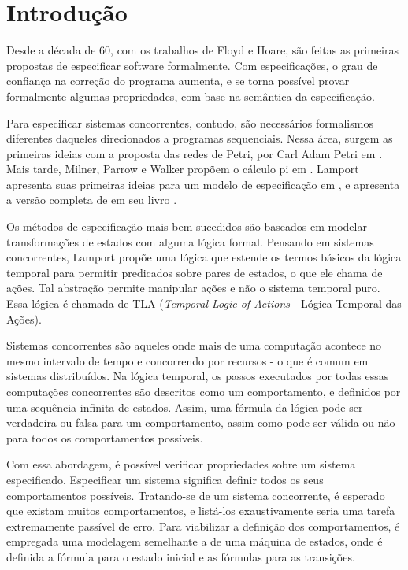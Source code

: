 \chapter{Introdução}
\label{introducao}

Desde a década de 60, com os trabalhos de Floyd e Hoare, são feitas as primeiras propostas de especificar software formalmente. Com especificações, o grau de confiança na correção do programa aumenta, e se torna possível provar formalmente algumas propriedades, com base na semântica da especificação.

Para especificar sistemas concorrentes, contudo, são necessários formalismos diferentes daqueles direcionados a programas sequenciais. Nessa área, surgem as primeiras ideias com a proposta das redes de Petri, por Carl Adam Petri em \cite{petri}. Mais tarde, Milner, Parrow e Walker propõem o cálculo pi em \cite{picalculus}. Lamport apresenta suas primeiras ideias para um modelo de especificação em \cite{first-lamport}, e apresenta a versão completa de \TLA em seu livro \cite{specifying-systems}.

Os métodos de especificação mais bem sucedidos são baseados em modelar transformações de estados com alguma lógica formal. Pensando em sistemas concorrentes, Lamport propõe uma lógica que estende os termos básicos da lógica temporal para permitir predicados sobre pares de estados, o que ele chama de ações. Tal abstração permite manipular ações e não o sistema temporal puro. Essa lógica é chamada de TLA (\textit{Temporal Logic of Actions} - Lógica Temporal das Ações).

Sistemas concorrentes são aqueles onde mais de uma computação acontece no mesmo intervalo de tempo e concorrendo por recursos - o que é comum em sistemas distribuídos. Na lógica temporal, os passos executados por todas essas computações concorrentes são descritos como um comportamento, e definidos por uma sequência infinita de estados. Assim, uma fórmula da lógica pode ser verdadeira ou falsa para um comportamento, assim como pode ser válida ou não para todos os comportamentos possíveis.

Com essa abordagem, é possível verificar propriedades sobre um sistema especificado. Especificar um sistema significa definir todos os seus comportamentos possíveis. Tratando-se de um sistema concorrente, é esperado que existam muitos comportamentos, e listá-los exaustivamente seria uma tarefa extremamente passível de erro. Para viabilizar a definição dos comportamentos, é empregada uma modelagem semelhante a de uma máquina de estados, onde é definida a fórmula para o estado inicial e as fórmulas para as transições.

